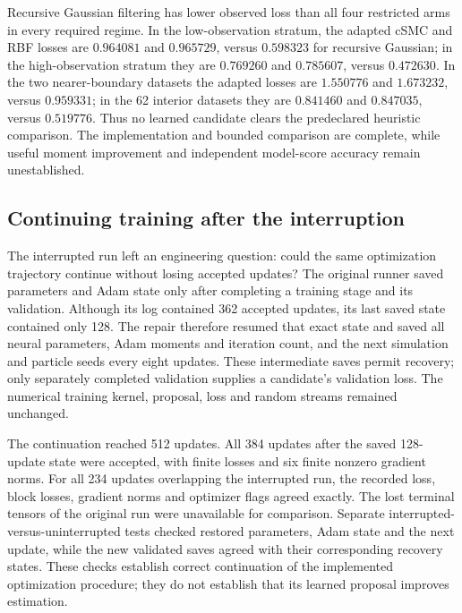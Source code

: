 Recursive Gaussian filtering has lower observed loss than all four restricted
arms in every required regime. In the low-observation stratum, the adapted
cSMC and RBF losses are \(0.964081\) and \(0.965729\), versus
\(0.598323\) for recursive Gaussian; in the high-observation stratum they
are \(0.769260\) and \(0.785607\), versus \(0.472630\). In the two
nearer-boundary datasets the adapted losses are \(1.550776\) and
\(1.673232\), versus \(0.959331\); in the 62 interior datasets they are
\(0.841460\) and \(0.847035\), versus \(0.519776\). Thus no learned
candidate clears the predeclared heuristic comparison. The implementation and
bounded comparison are complete, while useful moment improvement and
independent model-score accuracy remain unestablished.

\subsection{Continuing training after the interruption}
\label{sec:sg-neural-recovery}

The interrupted run left an engineering question: could the same optimization
trajectory continue without losing accepted updates? The original runner saved
parameters and Adam state only after completing a training stage and its
validation. Although its log contained 362 accepted updates, its last saved
state contained only 128. The repair therefore resumed that exact state and
saved all neural parameters, Adam moments and iteration count, and the next
simulation and particle seeds every eight updates. These intermediate saves
permit recovery; only separately completed validation supplies a candidate's
validation loss. The numerical training kernel, proposal, loss and random
streams remained unchanged.

The continuation reached 512 updates. All 384 updates after the saved
128-update state were accepted, with finite losses and six finite nonzero
gradient norms. For all 234 updates overlapping the interrupted run, the
recorded loss, block losses, gradient norms and optimizer flags agreed exactly.
The lost terminal tensors of the original run were unavailable for comparison.
Separate interrupted-versus-uninterrupted tests checked restored parameters,
Adam state and the next update, while the new validated saves agreed with their
corresponding recovery states. These checks establish correct continuation of
the implemented optimization procedure; they do not establish that its learned
proposal improves estimation.

